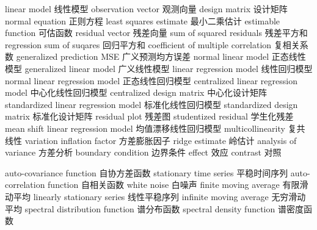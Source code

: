 {linear model} 
{线性模型}
{observation vector} 
{观测向量}
{design matrix} 
{设计矩阵}
{normal equation} 
{正则方程}
{least squares estimate} 
{最小二乘估计}
{estimable function} 
{可估函数}
{residual vector} 
{残差向量}
{sum of squared residuals} 
{残差平方和}
{regression sum of suqares} 
{回归平方和}
{coefficient of multiple correlation} 
{复相关系数}
{generalized prediction MSE} 
{广义预测均方误差}
{normal linear model} 
{正态线性模型}
{generalized linear model} 
{广义线性模型}
{linear regression model} 
{线性回归模型}
{normal linear regression model} 
{正态线性回归模型}
{centralized linear regression model} 
{中心化线性回归模型}
{centralized design matrix} 
{中心化设计矩阵}
{standardized linear regression model} 
{标准化线性回归模型}
{standardized design matrix} 
{标准化设计矩阵}
{residual plot} 
{残差图}
{studentized residual} 
{学生化残差}
{mean shift linear regression model} 
{均值漂移线性回归模型}
{multicollinearity} 
{复共线性}
{variation inflation factor} 
{方差膨胀因子}
{ridge estimate} 
{岭估计}
{analysis of variance} 
{方差分析}
{boundary condition} 
{边界条件}
{effect} 
{效应}
{contrast} 
{对照}

{auto-covariance function} 
{自协方差函数}
{stationary time series} 
{平稳时间序列}
{auto-correlation function} 
{自相关函数}
{white noise} 
{白噪声}
{finite moving average} 
{有限滑动平均}
{linearly stationary series} 
{线性平稳序列}
{infinite moving average} 
{无穷滑动平均}
{spectral distribution function} 
{谱分布函数}
{spectral density function} 
{谱密度函数}


